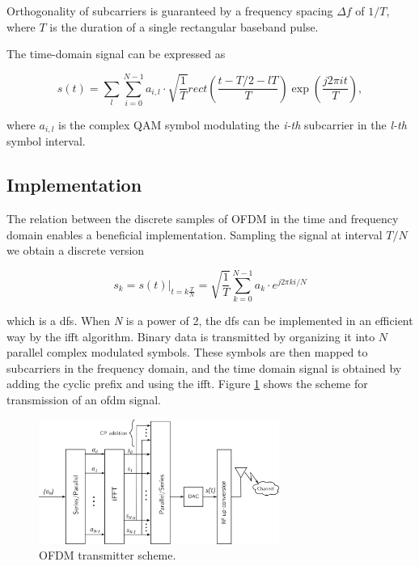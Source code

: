 Orthogonality of subcarriers is guaranteed by a frequency spacing $\Delta f$ of $1/T$, where $T$ is the duration of a single rectangular baseband pulse.

The time-domain signal can be expressed as

\begin{equation*}
    s(t) = \sum_l\sum_{i=0}^{N-1} a_{i,l}\cdot \sqrt{\frac{1}{T}} rect \left( \frac{t-T/2 - lT}{T} \right)\exp{\left(\frac{j2\pi it}{T}\right)},
\end{equation*}

where $a_{i,l}$ is the complex QAM symbol modulating the \textit{i-th} subcarrier in the \textit{l-th} symbol interval.

\subsection{Implementation}
The relation between the discrete samples of OFDM in the time and frequency domain enables a beneficial implementation.
Sampling the signal at interval $T/N$ we obtain a discrete version

\begin{equation*}
    s_k = s(t)|_{t=k \frac{T}{N}} = \sqrt{\frac{1}{T}}\sum_{k=0}^{N-1} a_k \cdot e^{j2\pi ki/N}
\end{equation*}

which is a \gls{dfs}. When \textit{N} is a power of 2, the \gls{dfs} can be implemented in an efficient way by the \gls{ifft} algorithm.
Binary data is transmitted by organizing it into $N$ parallel complex modulated symbols. These symbols are then mapped to subcarriers in the frequency domain, and the time domain signal is obtained by adding the cyclic prefix and using the \gls{ifft}. Figure \ref{fig:ofdm_transmit} shows the scheme for transmission of an \gls{ofdm} signal.

\begin{figure}[H]
	\centering
	\includegraphics[width=0.7\textwidth]{Images/theoretical/ofdm/ofdm_transmit.png}
	\caption{OFDM transmitter scheme.}
	\label{fig:ofdm_transmit}
\end{figure}

